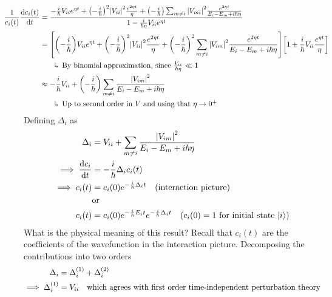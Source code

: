 \documentclass[12pt,a4paper,titlepage]{article}
\newcommand{\trm}[1]{\textrm{#1}} %
\newcommand{\explain}[1]{%
	\quad\rotatebox[origin=c]{180}{\enskip$\Lsh$}\hfill
	\begin{minipage}[t]{\dimexpr\linewidth-8em\relax}
	#1
	\end{minipage}\hspace{4em}\bigskip
}
\begin{document}
\begin{equation}
\hspace{-1cm}
\begin{aligned}
\frac{1}{c_{i}(t)}\dv{c_{i}(t)}{t}&=\frac{-\frac{i}{\hbar}V_{ii}e^{\eta t}+\qty(-\frac{i}{\hbar})^{2}\abs{V_{ii}}^{2}\frac{e^{2\eta t}}{\eta}+\qty(-\frac{i}{\hbar})\sum_{m\neq i}\abs{V_{mi}}^{2}\frac{e^{2\eta t}}{E_{i}-E_{m}+i\hbar\eta}}{1-\frac{i}{\hbar\eta}V_{ii}e^{\eta t}}\\
&=\qty[\qty(-\frac{i}{\hbar})V_{ii}e^{\eta t}+\qty(-\frac{i}{\hbar})^{2}\abs{V_{ii}}^{2}\frac{e^{2\eta t}}{\eta}+\qty(-\frac{i}{\hbar})^{2}\sum_{m\neq i}\abs{V_{im}}^{2}\frac{e^{2\eta t}}{E_{i}-E_{m}+i\hbar\eta}]\qty[1+\frac{i}{\hbar}V_{ii}\frac{e^{\eta t}}{\eta}]\\
&\quad\explain{By binomial approximation, since $\frac{V_{ii}}{\hbar\eta}\ll1$}\\
&\approx-\frac{i}{\hbar}V_{ii}+\qty(-\frac{i}{\hbar})\sum_{m\neq i}\frac{\abs{V_{im}}^{2}}{E_{i}-E_{m}+i\hbar\eta}\\
&\quad\explain{Up to second order in $V$ and using that $\eta\rightarrow0^{+}$}
\end{aligned}
\end{equation}
Defining $\Delta_{i}$ as
\begin{equation}
\begin{aligned}
\Delta_{i}&=V_{ii}+\sum_{m\neq i}\frac{\abs{V_{im}}^{2}}{E_{i}-E_{m}+i\hbar\eta}\\
\implies\dv{c_{i}}{t}&=-\frac{i}{\hbar}\Delta_{i}c_{i}(t)\\
\implies c_{i}(t)&=c_{i}(0)e^{-\frac{i}{\hbar}\Delta_{i}t}\qq{(interaction picture)}\\
&\trm{or}\\
c_{i}(t)&=c_{i}(0)e^{-\frac{i}{\hbar}E_{i}t}e^{-\frac{i}{\hbar}\Delta_{i}t}\qq{($c_{i}(0)=1$ for initial state $\ket{i}$)}
\end{aligned}
\end{equation}
What is the physical meaning of this result? Recall that $c_{i}(t)$ are the coefficients of the wavefunction in the interaction picture. Decomposing the contributions into two orders
\begin{equation}
\begin{aligned}
\Delta_{i}&=\Delta_{i}^{(1)}+\Delta_{i}^{(2)}\\
\implies\Delta_{i}^{(1)}&=V_{ii}\qq{which agrees with first order time-independent perturbation theory}
\end{aligned}
\end{equation}
\end{document}
